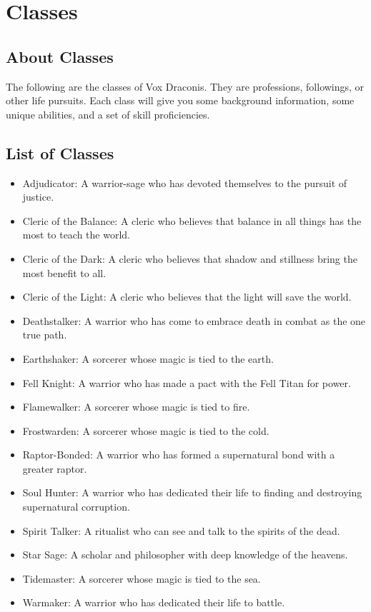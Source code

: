 \chapter{Classes}

\begin{multicols}{2}

\section{About Classes}

The following are the classes of Vox Draconis. They are professions,
followings, or other life pursuits. Each class will give you some
background information, some unique abilities, and a set of skill
proficiencies.

\section{List of Classes}

\begin{itemize}
  \item Adjudicator: A warrior-sage who has devoted themselves to the pursuit of justice.
  \item Cleric of the Balance: A cleric who believes that balance in all things has the most to teach the world.
  \item Cleric of the Dark: A cleric who believes that shadow and stillness bring the most benefit to all.
  \item Cleric of the Light: A cleric who believes that the light will save the world.
  \item Deathstalker: A warrior who has come to embrace death in combat as the one true path.
  \item Earthshaker: A sorcerer whose magic is tied to the earth.
  \item Fell Knight: A warrior who has made a pact with the Fell Titan for power.
  \item Flamewalker: A sorcerer whose magic is tied to fire.
  \item Frostwarden: A sorcerer whose magic is tied to the cold.
  \item Raptor-Bonded: A warrior who has formed a supernatural bond with a greater raptor.
  \item Soul Hunter: A warrior who has dedicated their life to finding and destroying supernatural corruption.
  \item Spirit Talker: A ritualist who can see and talk to the spirits of the dead.
  \item Star Sage: A scholar and philosopher with deep knowledge of the heavens.
  \item Tidemaster: A sorcerer whose magic is tied to the sea.
  \item Warmaker: A warrior who has dedicated their life to battle.
\end{itemize}


\end{multicols}
